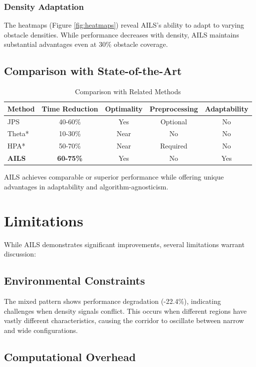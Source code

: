 \documentclass[journal]{IEEEtran}
\begin{document}
\subsubsection{Density Adaptation}
The heatmaps (Figure \ref{fig:heatmaps}) reveal AILS's ability to adapt to varying obstacle densities. While performance decreases with density, AILS maintains substantial advantages even at 30\% obstacle coverage.

\subsection{Comparison with State-of-the-Art}

\begin{table}[h]
\centering
\caption{Comparison with Related Methods}
\label{tab:sota_comparison}
\begin{tabular}{lcccc}
\toprule
Method & Time Reduction & Optimality & Preprocessing & Adaptability \\
\midrule
JPS & 40-60\% & Yes & Optional & No \\
Theta* & 10-30\% & Near & No & No \\
HPA* & 50-70\% & Near & Required & No \\
\textbf{AILS} & \textbf{60-75\%} & Yes & No & Yes \\
\bottomrule
\end{tabular}
\end{table}

AILS achieves comparable or superior performance while offering unique advantages in adaptability and algorithm-agnosticism.

\section{Limitations}

While AILS demonstrates significant improvements, several limitations warrant discussion:

\subsection{Environmental Constraints}

The mixed pattern shows performance degradation (-22.4\%), indicating challenges when density signals conflict. This occurs when different regions have vastly different characteristics, causing the corridor to oscillate between narrow and wide configurations.

\subsection{Computational Overhead}
\end{document}
